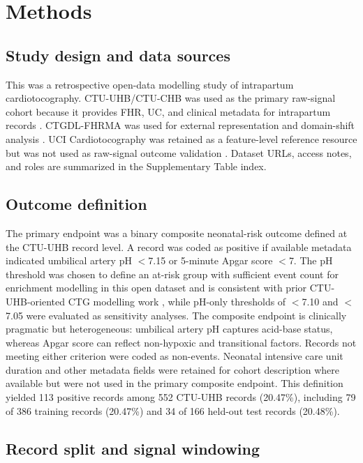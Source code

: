 \documentclass[11pt]{article}
\begin{document}
\section{Methods}

\subsection{Study design and data sources}

This was a retrospective open-data modelling study of intrapartum cardiotocography. CTU-UHB/CTU-CHB was used as the primary raw-signal cohort because it provides FHR, UC, and clinical metadata for intrapartum records \cite{goldberger2000,chudacek2014,ctuuhb}. CTGDL-FHRMA was used for external representation and domain-shift analysis \cite{ctgdl}. UCI Cardiotocography was retained as a feature-level reference resource but was not used as raw-signal outcome validation \cite{uci}. Dataset URLs, access notes, and roles are summarized in the Supplementary Table index.

\subsection{Outcome definition}

The primary endpoint was a binary composite neonatal-risk outcome defined at the CTU-UHB record level. A record was coded as positive if available metadata indicated umbilical artery pH $<$7.15 or 5-minute Apgar score $<$7. The pH threshold was chosen to define an at-risk group with sufficient event count for enrichment modelling in this open dataset and is consistent with prior CTU-UHB-oriented CTG modelling work \cite{chudacek2014,deepctg2023}, while pH-only thresholds of $<$7.10 and $<$7.05 were evaluated as sensitivity analyses. The composite endpoint is clinically pragmatic but heterogeneous: umbilical artery pH captures acid-base status, whereas Apgar score can reflect non-hypoxic and transitional factors. Records not meeting either criterion were coded as non-events. Neonatal intensive care unit duration and other metadata fields were retained for cohort description where available but were not used in the primary composite endpoint. This definition yielded 113 positive records among 552 CTU-UHB records (20.47\%), including 79 of 386 training records (20.47\%) and 34 of 166 held-out test records (20.48\%).

\subsection{Record split and signal windowing}
\end{document}
